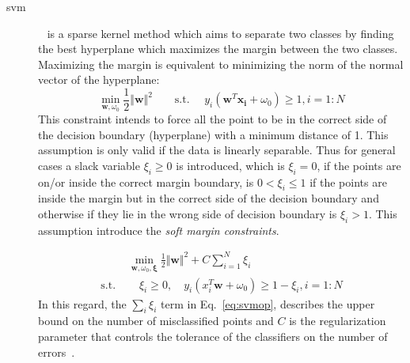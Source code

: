 \begin{description}
\item[\acl{svm}]~\cite{vapnik1963generalized} is a sparse kernel method which aims to separate two classes by finding the best hyperplane which maximizes the margin between the two classes. 
Maximizing the margin is equivalent to minimizing the norm of the normal vector of the hyperplane: 
\begin{equation}
\min\limits_{\mathbf{w}, \omega_{0}} \frac{1}{2} \Vert \mathbf{w}\Vert^{2} \qquad \text{s.t. } \quad  y_{i}(\mathbf{w}^{T}\mathbf{x_{i}} + \omega_{0}) \geq 1, i = 1: N
\label{eq:svmsm}
\end{equation}
\noindent This constraint intends to force all the point to be in the correct side of the decision boundary (hyperplane) with a minimum distance of 1. 
This assumption is only valid if the data is linearly separable. 
Thus for general cases a slack variable $\xi_{i} \geq 0 $ is introduced, which is $\xi_{i} = 0 $, if the points are on/or inside the correct margin boundary, is $0 < \xi_{i} \leq 1 $ if the points are inside the margin but in the correct side of the decision boundary and otherwise if they lie in the wrong side of decision boundary is $\xi_{i} > 1 $. 
This assumption introduce the \textit{soft margin constraints}.

\begin{align}
 & \min\limits_{\mathbf{w},\omega_{0}, \mathbf{\xi}} \frac{1}{2} \Vert \mathbf{w} \Vert^{2} + C \sum\limits_{i = 1}^{N} \xi_{i} \nonumber \\ 
\text{s.t. } & \quad \xi_{i} \geq 0, \quad y_{i}(x_{i}^{T}\mathbf{w} + \omega_{0}) \geq 1 - \xi_{i}, i = 1:N 
\label{eq:svmop}
\end{align}
In this regard, the $\sum_{i} \xi_{i}$ term in Eq.~\ref{eq:svmop}, describes the upper bound on the number of misclassified points and $C$ is the regularization parameter that controls the tolerance of the classifiers on the number of errors~\cite{murphy2012machine}. \\


\end{description}
